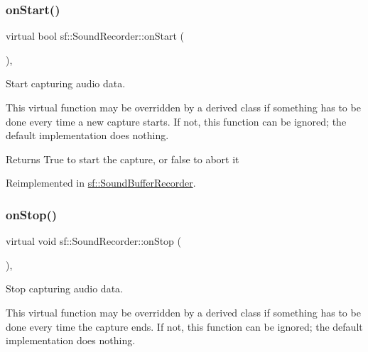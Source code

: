 \mbox{\label{classsf_1_1_sound_recorder_a7af418fb036201d3f85745bef78ce77f}} 
\subsubsection{\texorpdfstring{on\+Start()}{onStart()}}
{\footnotesize\ttfamily virtual bool sf\+::\+Sound\+Recorder\+::on\+Start (\begin{DoxyParamCaption}{ }\end{DoxyParamCaption})\hspace{0.3cm}{\ttfamily [protected]}, {\ttfamily [virtual]}}



Start capturing audio data. 

This virtual function may be overridden by a derived class if something has to be done every time a new capture starts. If not, this function can be ignored; the default implementation does nothing.

\begin{DoxyReturn}{Returns}
True to start the capture, or false to abort it 
\end{DoxyReturn}


Reimplemented in \hyperlink{classsf_1_1_sound_buffer_recorder_a531a7445fc8a48eaf9fc039c83f17c6f}{sf\+::\+Sound\+Buffer\+Recorder}.

\mbox{\label{classsf_1_1_sound_recorder_aefc36138ca1e96c658301280e4a31b64}} 
\subsubsection{\texorpdfstring{on\+Stop()}{onStop()}}
{\footnotesize\ttfamily virtual void sf\+::\+Sound\+Recorder\+::on\+Stop (\begin{DoxyParamCaption}{ }\end{DoxyParamCaption})\hspace{0.3cm}{\ttfamily [protected]}, {\ttfamily [virtual]}}



Stop capturing audio data. 

This virtual function may be overridden by a derived class if something has to be done every time the capture ends. If not, this function can be ignored; the default implementation does nothing. 

